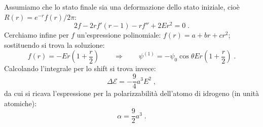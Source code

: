 \documentclass[10pt,a4paper]{report}
\theoremstyle{definition}
\numberwithin{equation}{section}
\begin{document}
Assumiamo che lo stato finale sia una deformazione dello stato iniziale, cioè $R(r)=e^{-r}f(r)/2\pi$:
\begin{equation}
2f-2rf'(r-1)-rf''+2Er^2=0\;.
\end{equation}
Cerchiamo infine per $f$ un'espressione polinomiale: $f(r)=a+br+cr^2$; sostituendo si trova la soluzione:
\begin{equation}
f(r)=-Er\left(1+\frac{r}{2}\right)\qquad\Longrightarrow\qquad \psi^{(1)}=-\psi_0\cos\theta Er\left(1+\frac{r}{2}\right)\;.
\end{equation}
Calcolando l'integrale per lo shift si trova invece:
\begin{equation}
\Delta\mathcal{E}=-\frac{9}{4}a^3E^2\;,
\end{equation}
da cui si ricava l'espressione per la polarizzabilità dell'atomo di idrogeno (in unità atomiche):
\begin{equation}
\alpha=\frac{9}{2}a^3\;.
\end{equation}
\end{document}
